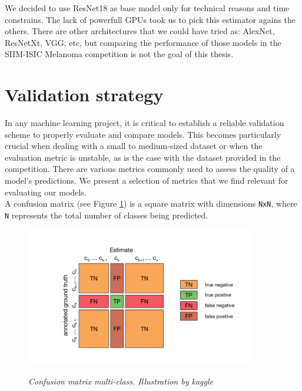 We decided to use ResNet18 as base model only for technical reasons and time
constrains. The lack of powerfull GPUs took us to pick this estimator agains
the others. There are other architectures that we could have tried as: AlexNet,
ResNetXt, VGG, etc, but comparing the performance of those models in the
SIIM-ISIC Melanoma competition is not the goal of this thesis.

\section{Validation strategy}

In any machine learning project, it is critical to establish a reliable
validation scheme to properly evaluate and compare models. This becomes
particularly crucial when dealing with a small to medium-sized dataset or when
the evaluation metric is unstable, as is the case with the dataset provided in
the competition. There are various metrics commonly used to assess the quality of a model's
predictions. We present a selection of metrics that we find relevant for
evaluating our models. \\

A confusion matrix (see Figure \ref{fig:confusion-matrix}) is a square matrix
with dimensions {\tt NxN}, where {\tt N} represents the total number of classes being
predicted.

\begin{figure}[H]
  \begin{adjustbox}{trim={0pt 0.5cm 0pt 1cm}, clip}
    \centering
    \includegraphics[width=0.9\textwidth]{imatges/validation-strategy/confusion-matrix.png}
  \end{adjustbox}
  \caption[Confusion matrix multi-class]{\textit{Confusion matrix multi-class. Illustration by kaggle}}
  {\label{fig:confusion-matrix}}
\end{figure}

